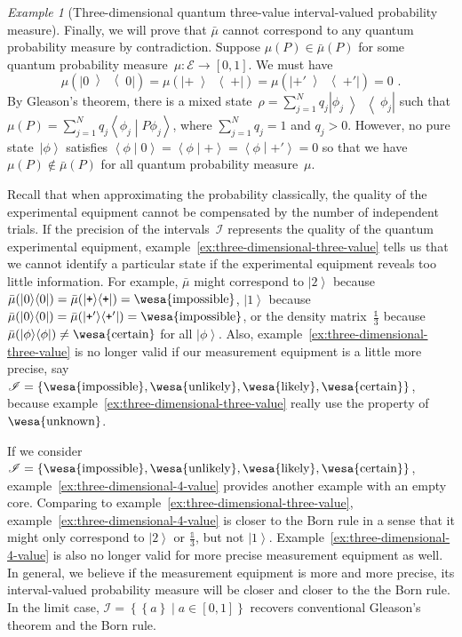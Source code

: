 \documentclass{article}
\theoremstyle{remark}
\newtheorem{example}{Example}
\newcommand{\events}{\ensuremath{\mathcal{E}}}
\newcommand{\imposs}{{\mbox{\wesa{impossible}}}}
\newcommand{\likely}{{\mbox{\wesa{likely}}}}
\newcommand{\unlikely}{{\mbox{\wesa{unlikely}}}}
\newcommand{\necess}{{\mbox{\wesa{certain}}}}
\newcommand{\unknown}{{\mbox{\wesa{unknown}}}}
\newcommand{\ket}[1]{{\left\vert{#1}\right\rangle}}
\newcommand{\op}[2]{\ensuremath{\left\vert{#1}\middle\rangle\middle\langle{#2}\right\vert}}
\newcommand{\proj}[1]{\op{#1}{#1}}
\newcommand{\ps}{\texttt{+}}
\newcommand{\ip}[2]{\ensuremath{\left\langle{#1}\middle\vert{#2}\right\rangle}}
\begin{document}
\begin{example}[Three-dimensional quantum three-value interval-valued
probability measure]
Finally, we will prove that $\bar{\mu}$ cannot correspond to any
quantum probability measure by contradiction. Suppose $\mu(P)\in\bar{\mu}(P)$
for some quantum probability measure~$\mu:\events\rightarrow\left[0,1\right]$.
We must have 
\begin{equation}
\mu(\proj{0})=\mu(\proj{\ps})=\mu(\proj{\ps'})=0\textrm{ .}\label{eq:probability-zero-on-states}
\end{equation}
By Gleason's theorem, there is a mixed
state~$\rho=\sum_{j=1}^{N}q_{j}\proj{\phi_{j}}$ such that
$\mu\left(P\right)=\sum_{j=1}^{N}q_{j}\ip{\phi_{j}}{P\phi_{j}}$,
where $\sum_{j=1}^{N}q_{j}=1$ and $q_{j}>0$.  However, no pure
state~$\ket{\phi}$ satisfies
$\ip{\phi}{0}=\ip{\phi}{\ps}=\ip{\phi}{\ps'}=0$ so that we have
$\mu(P)\notin\bar{\mu}(P)$ for all quantum probability measure~$\mu$.
\end{example}

Recall that when approximating the probability classically, the quality
of the experimental equipment cannot be compensated by the number
of independent trials. If the precision of the intervals~$\mathscr{I}$
represents the quality of the quantum experimental equipment, example~\ref{ex:three-dimensional-three-value}
tells us that we cannot identify a particular state if the experimental
equipment reveals too little information. For example, $\bar{\mu}$
might correspond to $\ket{2}$ because $\bar{\mu}(\proj{0})=\bar{\mu}(\proj{\ps})=\imposs$,
$\ket{1}$ because $\bar{\mu}(\proj{0})=\bar{\mu}(\proj{\ps'})=\imposs$,
or the density matrix~$\frac{\mathbb{1}}{3}$ because $\bar{\mu}(\proj{\phi})\ne\necess$
for all $\ket{\phi}$. Also, example~\ref{ex:three-dimensional-three-value}
is no longer valid if our measurement equipment is a little more precise,
say $\mathscr{I}=\left\{ \imposs,\unlikely,\likely,\necess\right\} $,
because example~\ref{ex:three-dimensional-three-value} really use
the property of $\unknown$.

If we consider
$\mathscr{I}=\left\{ \imposs,\unlikely,\likely,\necess\right\} $,
example~\ref{ex:three-dimensional-4-value} provides another example
with an empty core. Comparing to
example~\ref{ex:three-dimensional-three-value},
example~\ref{ex:three-dimensional-4-value} is closer to the Born rule
in a sense that it might only correspond to $\ket{2}$ or
$\frac{\mathbb{1}}{3}$, but not
$\ket{1}$. Example~\ref{ex:three-dimensional-4-value} is also no
longer valid for more precise measurement equipment as well.  In
general, we believe if the measurement equipment is more and more
precise, its interval-valued probability measure will be closer and
closer to the the Born rule. In the limit case,
$\mathscr{I}=\left\{ \left\{ a\right\}
  \middle|a\in\left[0,1\right]\right\} $
recovers conventional Gleason's theorem and the Born rule.
\end{document}
